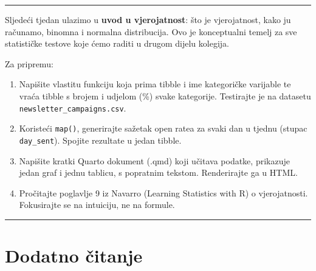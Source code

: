 \documentclass[
  croatian,
  letterpaper,
  DIV=11,
  numbers=noendperiod]{scrartcl}
\providecommand{\tightlist}{%
  \setlength{\itemsep}{0pt}\setlength{\parskip}{0pt}}
\begin{document}
\begin{tcolorbox}
\end{tcolorbox}

\begin{center}\rule{0.5\linewidth}{0.5pt}\end{center}

\begin{tcolorbox}[enhanced jigsaw, coltitle=black, arc=.35mm, colframe=quarto-callout-warning-color-frame, left=2mm, bottomrule=.15mm, toprule=.15mm, leftrule=.75mm, bottomtitle=1mm, colback=white, title=\textcolor{quarto-callout-warning-color}{\faExclamationTriangle}\hspace{0.5em}{Priprema za sljedeći tjedan}, opacityback=0, colbacktitle=quarto-callout-warning-color!10!white, toptitle=1mm, titlerule=0mm, opacitybacktitle=0.6, breakable, rightrule=.15mm]

Sljedeći tjedan ulazimo u \textbf{uvod u vjerojatnost}: što je
vjerojatnost, kako ju računamo, binomna i normalna distribucija. Ovo je
konceptualni temelj za sve statističke testove koje ćemo raditi u drugom
dijelu kolegija.

Za pripremu:

\begin{enumerate}
\def\labelenumi{\arabic{enumi}.}
\tightlist
\item
  Napišite vlastitu funkciju koja prima tibble i ime kategoričke
  varijable te vraća tibble s brojem i udjelom (\%) svake kategorije.
  Testirajte je na datasetu \texttt{newsletter\_campaigns.csv}.
\item
  Koristeći \texttt{map()}, generirajte sažetak open ratea za svaki dan
  u tjednu (stupac \texttt{day\_sent}). Spojite rezultate u jedan
  tibble.
\item
  Napišite kratki Quarto dokument (.qmd) koji učitava podatke, prikazuje
  jedan graf i jednu tablicu, s popratnim tekstom. Renderirajte ga u
  HTML.
\item
  Pročitajte poglavlje 9 iz Navarro (Learning Statistics with R) o
  vjerojatnosti. Fokusirajte se na intuiciju, ne na formule.
\end{enumerate}

\end{tcolorbox}

\begin{center}\rule{0.5\linewidth}{0.5pt}\end{center}

\section{Dodatno čitanje}\label{dodatno-ux10ditanje}
\end{document}
